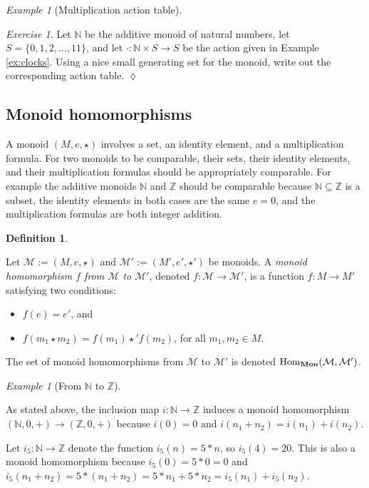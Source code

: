 \documentclass{book}
\def\tn{\textnormal}
\def\mc{\mathcal}
\def\ZZ{{\mathbb Z}}
\def\NN{{\mathbb N}}
\def\Hom{\tn{Hom}}
\def\to{\rightarrow}
\def\taking{\colon}
\def\ss{\subseteq}
\def\Mon{{\bf Mon}}
\def\mcM{\mc{M}}
\theoremstyle{remark}
\newtheorem{example}[subsubsection]{Example}
\newtheorem{exc}[subsubsection]{Exercise}
\newenvironment{exercise}{\begin{exc}}{\hspace*{\fill}$\lozenge$\end{exc}}
\theoremstyle{definition}
\newtheorem{definition}[subsubsection]{Definition}
\begin{document}
\begin{example}[Multiplication action table]
\end{example}

\begin{exercise}
Let $\NN$ be the additive monoid of natural numbers, let $S=\{0,1,2,\ldots,11\}$, and let $\cdot\taking\NN\times S\to S$ be the action given in Example \ref{ex:clocks}. Using a nice small generating set for the monoid, write out the corresponding action table.
\end{exercise}


\subsection{Monoid homomorphisms}

A monoid $(M,e,\star)$ involves a set, an identity element, and a multiplication formula. For two monoids to be comparable, their sets, their identity elements, and their multiplication formulas should be appropriately comparable. For example the additive monoids $\NN$ and $\ZZ$ should be comparable because $\NN\ss\ZZ$ is a subset, the identity elements in both cases are the same $e=0$, and the multiplication formulas are both integer addition. 

\begin{definition}\label{def:monoid hom}

Let $\mcM:=(M,e,\star)$ and $\mcM':=(M',e',\star')$ be monoids. A {\em monoid homomorphism $f$ from $\mcM$ to $\mcM'$}, denoted $f\taking\mcM\to\mcM'$, is a function $f\taking M\to M'$ satisfying two conditions:
\begin{itemize}
\item $f(e)=e'$, and 
\item $f(m_1\star m_2)=f(m_1)\star'f(m_2)$, for all $m_1,m_2\in M$.
\end{itemize}

The set of monoid homomorphisms from $\mcM$ to $\mcM'$ is denoted $\Hom_{\Mon}(\mcM,\mcM')$.

\end{definition}

\begin{example}[From $\NN$ to $\ZZ$]\label{ex:nat to int}

As stated above, the inclusion map $i\taking\NN\to\ZZ$ induces a monoid homomorphism $(\NN,0,+)\to(\ZZ,0,+)$ because $i(0)=0$ and $i(n_1+n_2)=i(n_1)+i(n_2)$. 

Let $i_5\taking\NN\to\ZZ$ denote the function $i_5(n)=5*n$, so $i_5(4)=20$. This is also a monoid homomorphism because $i_5(0)=5*0=0$ and $i_5(n_1+n_2)=5*(n_1+n_2)=5*n_1+5*n_2=i_5(n_1)+i_5(n_2).$

\end{example}
\end{document}
